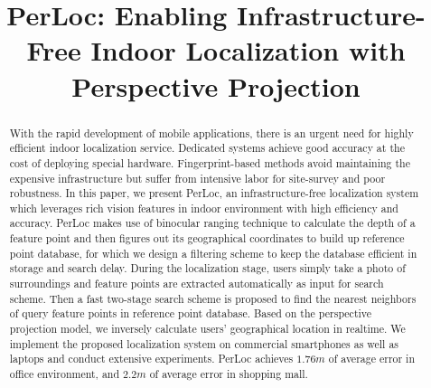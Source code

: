 \documentclass[10pt, conference, letterpaper]{IEEEtran}
\def\oursystem{\xspace{PerLoc}\xspace}
\begin{document}
\title{PerLoc: Enabling Infrastructure-Free Indoor Localization with Perspective Projection }


\author{
}


\maketitle


\begin{abstract}
With the rapid development of mobile applications, there is an urgent need for highly efficient indoor localization service.
Dedicated systems achieve good accuracy at the cost of deploying special hardware. Fingerprint-based methods avoid maintaining the expensive infrastructure but suffer from intensive labor for site-survey and poor robustness.
In this paper, we present \oursystem, an infrastructure-free localization system which leverages rich vision features in indoor environment with high efficiency and accuracy. \oursystem makes use of binocular ranging technique to calculate the depth of a feature point and then figures out its geographical coordinates to build up reference point database, for which we design a filtering scheme to keep the database efficient in storage and search delay. During the localization stage, users simply take a photo of surroundings and feature points are extracted automatically as input for search scheme. Then a fast two-stage search scheme is proposed to find the nearest neighbors of query feature points in reference point database. Based on the perspective projection model, we inversely calculate users' geographical location in realtime.
We implement the proposed localization system on commercial smartphones as well as laptops and conduct extensive experiments. \oursystem achieves $1.76m$ of average error in office environment, and $2.2m$ of average error in shopping mall.


\end{abstract}
\end{document}
